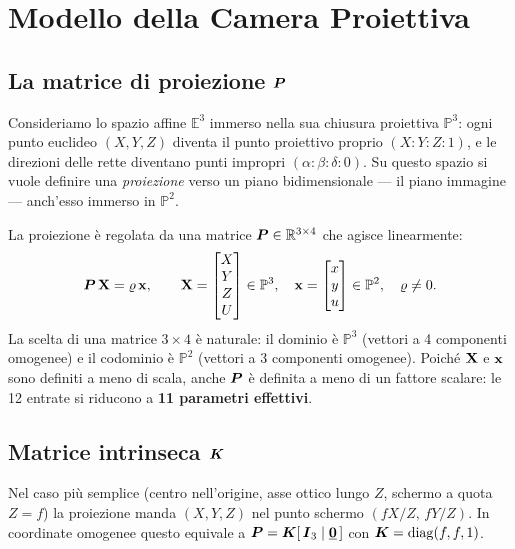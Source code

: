 \section{Modello della Camera Proiettiva}
\label{sec:modello_camera}

\subsection{La matrice di proiezione \(\boldsymbol{P}\)}
\label{sub:matrice_P}

Consideriamo lo spazio affine \(\mathbb{E}^3\) immerso nella sua chiusura
proiettiva \(\mathbb{P}^3\): ogni punto euclideo \((X,Y,Z)\) diventa
il punto proiettivo proprio \((X:Y:Z:1)\), e le direzioni delle rette
diventano punti impropri \((\alpha:\beta:\delta:0)\). Su questo spazio
si vuole definire una \emph{proiezione} verso un piano bidimensionale
--- il piano immagine --- anch'esso immerso in \(\mathbb{P}^2\).

La proiezione è regolata da una matrice \(\boldsymbol{P}\in\mathbb{R}^{3\times4}\)
che agisce linearmente:
\[
  \boldsymbol{P}\,\mathbf{X} = \varrho\,\mathbf{x},
  \qquad
  \mathbf{X} =
  \begin{bmatrix} X \\ Y \\ Z \\ U \end{bmatrix} \in \mathbb{P}^3,
  \quad
  \mathbf{x} =
  \begin{bmatrix} x \\ y \\ u \end{bmatrix} \in \mathbb{P}^2,
  \quad \varrho \neq 0.
\]
La scelta di una matrice \(3\times4\) è naturale: il dominio è
\(\mathbb{P}^3\) (vettori a 4 componenti omogenee) e il codominio è
\(\mathbb{P}^2\) (vettori a 3 componenti omogenee).
Poiché \(\mathbf{X}\) e \(\mathbf{x}\) sono definiti a meno di scala,
anche \(\boldsymbol{P}\) è definita a meno di un fattore scalare: le 12
entrate si riducono a \textbf{11 parametri effettivi}.

\subsection{Matrice intrinseca \(\boldsymbol{K}\)}
\label{sub:matrice_K}

Nel caso più semplice (centro nell'origine, asse ottico lungo \(Z\),
schermo a quota \(Z=f\)) la proiezione manda \((X,Y,Z)\) nel punto
schermo \((fX/Z,\, fY/Z)\). In coordinate omogenee questo equivale a
\(\boldsymbol{P} = \boldsymbol{K}[\,\boldsymbol{I}_3 \mid \underline{\mathbf{0}}\,]\) con
\(\boldsymbol{K} = \mathrm{diag}(f,f,1)\).

